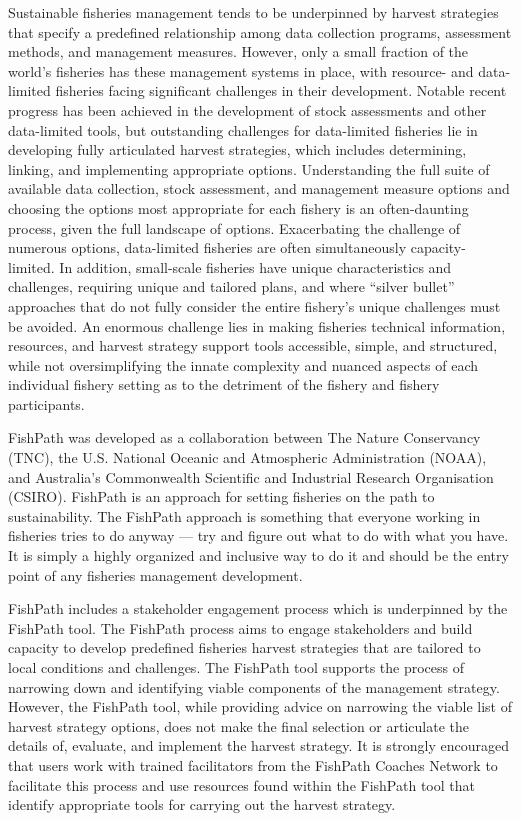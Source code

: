 \documentclass[11pt,]{book}
\begin{document}
Sustainable fisheries management tends to be underpinned by harvest strategies that specify a predefined relationship among data collection programs, assessment methods, and management measures. However, only a small fraction of the world's fisheries has these management systems in place, with resource- and data-limited fisheries facing significant challenges in their development. Notable recent progress has been achieved in the development of stock assessments and other data-limited tools, but outstanding challenges for data-limited fisheries lie in developing fully articulated harvest strategies, which includes determining, linking, and implementing appropriate options. Understanding the full suite of available data collection, stock assessment, and management measure options and choosing the options most appropriate for each fishery is an often-daunting process, given the full landscape of options. Exacerbating the challenge of numerous options, data-limited fisheries are often simultaneously capacity-limited. In addition, small-scale fisheries have unique characteristics and challenges, requiring unique and tailored plans, and where ``silver bullet'' approaches that do not fully consider the entire fishery's unique challenges must be avoided. An enormous challenge lies in making fisheries technical information, resources, and harvest strategy support tools accessible, simple, and structured, while not oversimplifying the innate complexity and nuanced aspects of each individual fishery setting as to the detriment of the fishery and fishery participants.

FishPath was developed as a collaboration between The Nature Conservancy (TNC), the U.S. National Oceanic and Atmospheric Administration (NOAA), and Australia's Commonwealth Scientific and Industrial Research Organisation (CSIRO). FishPath is an approach for setting fisheries on the path to sustainability. The FishPath approach is something that everyone working in fisheries tries to do anyway --- try and figure out what to do with what you have. It is simply a highly organized and inclusive way to do it and should be the entry point of any fisheries management development.

FishPath includes a stakeholder engagement process which is underpinned by the FishPath tool. The FishPath process aims to engage stakeholders and build capacity to develop predefined fisheries harvest strategies that are tailored to local conditions and challenges. The FishPath tool supports the process of narrowing down and identifying viable components of the management strategy. However, the FishPath tool, while providing advice on narrowing the viable list of harvest strategy options, does not make the final selection or articulate the details of, evaluate, and implement the harvest strategy. It is strongly encouraged that users work with trained facilitators from the FishPath Coaches Network to facilitate this process and use resources found within the FishPath tool that identify appropriate tools for carrying out the harvest strategy.
\end{document}
